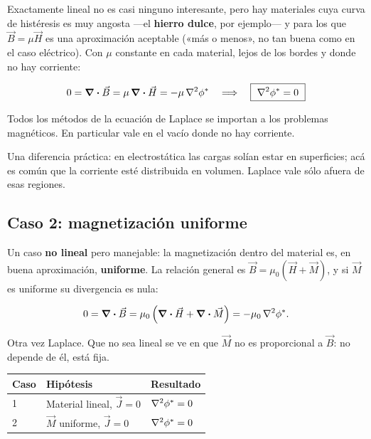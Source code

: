 \documentclass[12pt,a4paper]{article}
\begin{document}
Exactamente lineal no es casi ninguno interesante, pero hay materiales cuya
curva de histéresis es muy angosta ---el \textbf{hierro dulce}, por ejemplo--- y para
los que $\vec B = \mu\vec H$ es una aproximación aceptable («más o menos»,
no tan buena como en el caso eléctrico). Con $\mu$ constante en cada material,
lejos de los bordes y donde no hay corriente:

\[
0 = \div\vec B = \mu\,\div\vec H = -\mu\,\laplacian\phi^*
\quad\Longrightarrow\quad
\boxed{\ \laplacian\phi^* = 0\ }
\]

Todos los métodos de la ecuación de Laplace se importan a los problemas
magnéticos. En particular vale en el vacío donde no hay corriente.

\begin{notebox}
Una diferencia práctica: en electrostática las cargas solían estar en
superficies; acá es común que la corriente esté distribuida en volumen. Laplace
vale sólo afuera de esas regiones.
\end{notebox}

\subsection{Caso 2: magnetización uniforme}

Un caso \textbf{no lineal} pero manejable: la magnetización dentro del material es,
en buena aproximación, \textbf{uniforme}. La relación general es
$\vec B = \mu_0(\vec H + \vec M)$, y si $\vec M$ es uniforme su divergencia es
nula:

\[
0 = \div\vec B = \mu_0\left(\div\vec H + \div\vec M\right)
= -\mu_0\,\laplacian\phi^* .
\]

Otra vez Laplace. Que no sea lineal se ve en que $\vec M$ no es proporcional a
$\vec B$: no depende de él, está fija.

\begin{center}
\renewcommand{\arraystretch}{1.35}
\small
\begin{tabularx}{\textwidth}{l>{\raggedright\arraybackslash}X>{\raggedright\arraybackslash}X}
\toprule
\textbf{Caso} & \textbf{Hipótesis} & \textbf{Resultado} \\
\midrule
1 & Material lineal, $\vec J = 0$ & $\laplacian\phi^* = 0$ \\
2 & $\vec M$ uniforme, $\vec J = 0$ & $\laplacian\phi^* = 0$ \\
\bottomrule
\end{tabularx}
\end{center}
\end{document}
